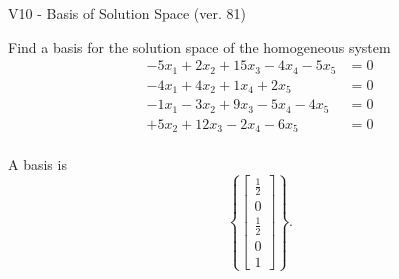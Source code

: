 \begin{exercise}
  \begin{exerciseTitle}V10 - Basis of Solution Space (ver. 81)\end{exerciseTitle}
  \begin{exerciseStatement}
    Find a basis for the solution space of the homogeneous system 
\begin{align*}
 -5 x_ 1 + 2 x_ 2 + 15 x_ 3 -4 x_ 4 -5 x_ 5 &= 0  \\ 
  -4 x_ 1 + 4 x_ 2 + 1 x_ 4 + 2 x_ 5 &= 0  \\ 
  -1 x_ 1 -3 x_ 2 + 9 x_ 3 -5 x_ 4 -4 x_ 5 &= 0  \\ 
  + 5 x_ 2 + 12 x_ 3 -2 x_ 4 -6 x_ 5 &= 0  \\ 
 \end{align*}


 
  \end{exerciseStatement}

  \begin{exerciseAnswer}
   A basis is   
\[\left\{\left[\begin{array}{c}
\frac{1}{2} \\
0 \\
\frac{1}{2} \\
0 \\
1
\end{array}\right]\right\}.\]

  


  \end{exerciseAnswer}
\end{exercise}